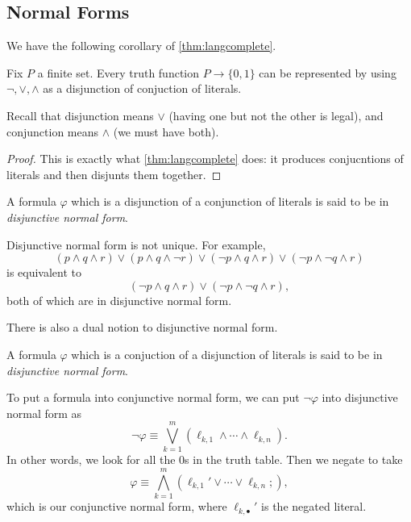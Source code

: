 \subsection{Normal Forms}
We have the following corollary of \autoref{thm:langcomplete}.
\begin{corollary} \label{cor:dnf}
	Fix $P$ a finite set. Every truth function $P\to\{0,1\}$ can be represented by using $\lnot,\lor,\land$ as a disjunction of conjuction of literals.
\end{corollary}
Recall that disjunction means $\lor$ (having one but not the other is legal), and conjunction means $\land$ (we must have both).
\begin{proof}
	This is exactly what \autoref{thm:langcomplete} does: it produces conjucntions of literals and then disjunts them together.
\end{proof}
\begin{definition}
	A formula $\varphi$ which is a disjunction of a conjunction of literals is said to be in \textit{disjunctive normal form}.
\end{definition}
\begin{example}
	Disjunctive normal form is not unique. For example,
	\[(p\land q\land r)\lor(p\land q\land\lnot r)\lor(\lnot p\land q\land r)\lor(\lnot p\land\lnot q\land r)\]
	is equivalent to
	\[(\lnot p\land q\land r)\lor(\lnot p\land\lnot q\land r),\]
	both of which are in disjunctive normal form.
\end{example}
There is also a dual notion to disjunctive normal form.
\begin{definition}
	A formula $\varphi$ which is a conjuction of a disjunction of literals is said to be in \textit{disjunctive normal form}.
\end{definition}
To put a formula into conjunctive normal form, we can put $\lnot\varphi$ into disjunctive normal form as
\[\lnot\varphi\equiv\bigvee_{k=1}^m(\ell_{k,1}\land\cdots\land\ell_{k,n}).\]
In other words, we look for all the $0$s in the truth table. Then we negate to take
\[\varphi\equiv\bigwedge_{k=1}^m(\ell_{k,1}'\lor\cdots\lor\ell_{k,n};),\]
which is our conjunctive normal form, where $\ell_{k,\bullet}'$ is the negated literal.
